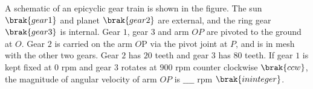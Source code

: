 
\iffalse
    \title{Assignment}
    \author{EE24BTECH11028}
    \section{me}
    \chapter{2022}
  \fi
          \item A schematic of an epicyclic gear train is shown in the figure. The sun $\brak{gear 1}$ and planet $\brak{gear 2}$ are external, and the ring gear $\brak{gear 3}$ is internal. Gear $1$, gear $3$ and arm $OP$ are pivoted to the ground at $O$. Gear $2$ is carried on the arm $O$P via the pivot joint at $P$, and is in mesh with the other two gears. Gear $2$ has $20$ teeth and gear $3$ has $80$ teeth. If gear $1$ is kept fixed at $0$ rpm and gear $3$ rotates at $900$ rpm counter clockwise $\brak{ccw}$, the magnitude of angular velocity of arm $OP$ is   $\_\_\_\_$ rpm $\brak{in integer}$.
     


